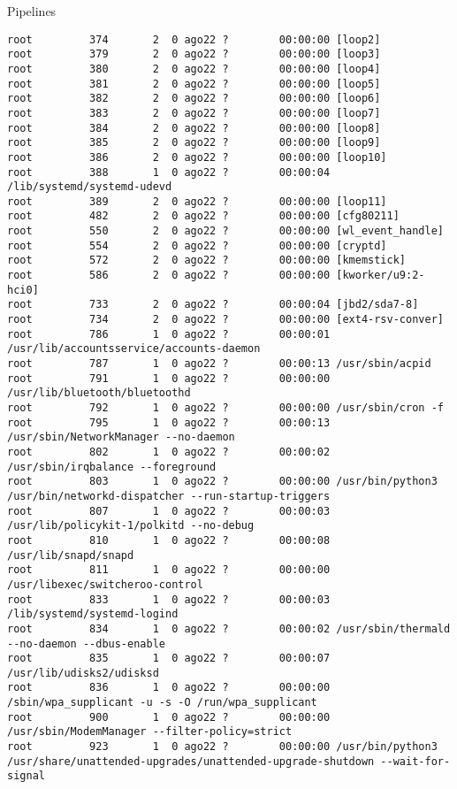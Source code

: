 \begin{section}{Pipelines}
\begin{lstlisting}[style=Ubuntu]
root         374       2  0 ago22 ?        00:00:00 [loop2]
root         379       2  0 ago22 ?        00:00:00 [loop3]
root         380       2  0 ago22 ?        00:00:00 [loop4]
root         381       2  0 ago22 ?        00:00:00 [loop5]
root         382       2  0 ago22 ?        00:00:00 [loop6]
root         383       2  0 ago22 ?        00:00:00 [loop7]
root         384       2  0 ago22 ?        00:00:00 [loop8]
root         385       2  0 ago22 ?        00:00:00 [loop9]
root         386       2  0 ago22 ?        00:00:00 [loop10]
root         388       1  0 ago22 ?        00:00:04 /lib/systemd/systemd-udevd
root         389       2  0 ago22 ?        00:00:00 [loop11]
root         482       2  0 ago22 ?        00:00:00 [cfg80211]
root         550       2  0 ago22 ?        00:00:00 [wl_event_handle]
root         554       2  0 ago22 ?        00:00:00 [cryptd]
root         572       2  0 ago22 ?        00:00:00 [kmemstick]
root         586       2  0 ago22 ?        00:00:00 [kworker/u9:2-hci0]
root         733       2  0 ago22 ?        00:00:04 [jbd2/sda7-8]
root         734       2  0 ago22 ?        00:00:00 [ext4-rsv-conver]
root         786       1  0 ago22 ?        00:00:01 /usr/lib/accountsservice/accounts-daemon
root         787       1  0 ago22 ?        00:00:13 /usr/sbin/acpid
root         791       1  0 ago22 ?        00:00:00 /usr/lib/bluetooth/bluetoothd
root         792       1  0 ago22 ?        00:00:00 /usr/sbin/cron -f
root         795       1  0 ago22 ?        00:00:13 /usr/sbin/NetworkManager --no-daemon
root         802       1  0 ago22 ?        00:00:02 /usr/sbin/irqbalance --foreground
root         803       1  0 ago22 ?        00:00:00 /usr/bin/python3 /usr/bin/networkd-dispatcher --run-startup-triggers
root         807       1  0 ago22 ?        00:00:03 /usr/lib/policykit-1/polkitd --no-debug
root         810       1  0 ago22 ?        00:00:08 /usr/lib/snapd/snapd
root         811       1  0 ago22 ?        00:00:00 /usr/libexec/switcheroo-control
root         833       1  0 ago22 ?        00:00:03 /lib/systemd/systemd-logind
root         834       1  0 ago22 ?        00:00:02 /usr/sbin/thermald --no-daemon --dbus-enable
root         835       1  0 ago22 ?        00:00:07 /usr/lib/udisks2/udisksd
root         836       1  0 ago22 ?        00:00:00 /sbin/wpa_supplicant -u -s -O /run/wpa_supplicant
root         900       1  0 ago22 ?        00:00:00 /usr/sbin/ModemManager --filter-policy=strict
root         923       1  0 ago22 ?        00:00:00 /usr/bin/python3 /usr/share/unattended-upgrades/unattended-upgrade-shutdown --wait-for-signal

\end{lstlisting}
\end{section}
